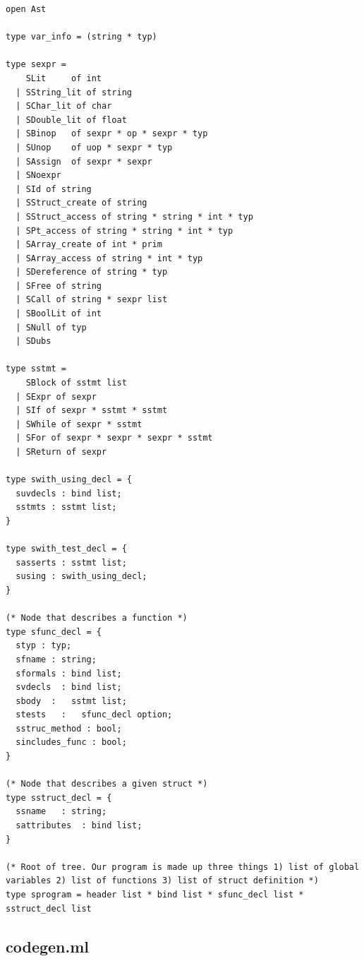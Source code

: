 \documentclass{article}
\begin{document}
\begin{lstlisting}
open Ast

type var_info = (string * typ)

type sexpr =
    SLit     of int
  | SString_lit of string
  | SChar_lit of char
  | SDouble_lit of float
  | SBinop   of sexpr * op * sexpr * typ
  | SUnop    of uop * sexpr * typ
  | SAssign  of sexpr * sexpr
  | SNoexpr
  | SId of string
  | SStruct_create of string
  | SStruct_access of string * string * int * typ
  | SPt_access of string * string * int * typ
  | SArray_create of int * prim
  | SArray_access of string * int * typ
  | SDereference of string * typ
  | SFree of string
  | SCall of string * sexpr list
  | SBoolLit of int
  | SNull of typ
  | SDubs

type sstmt =
    SBlock of sstmt list   
  | SExpr of sexpr
  | SIf of sexpr * sstmt * sstmt
  | SWhile of sexpr * sstmt
  | SFor of sexpr * sexpr * sexpr * sstmt
  | SReturn of sexpr

type swith_using_decl = {
  suvdecls : bind list;
  sstmts : sstmt list;
}

type swith_test_decl = {
  sasserts : sstmt list;
  susing : swith_using_decl;
}

(* Node that describes a function *)
type sfunc_decl = {
  styp : typ;
  sfname : string;
  sformals : bind list;
  svdecls  : bind list;
  sbody  :   sstmt list;
  stests   :   sfunc_decl option;
  sstruc_method : bool;
  sincludes_func : bool;
}

(* Node that describes a given struct *)
type sstruct_decl = {
  ssname   : string;
  sattributes  : bind list;
}

(* Root of tree. Our program is made up three things 1) list of global variables 2) list of functions 3) list of struct definition *)
type sprogram = header list * bind list * sfunc_decl list * sstruct_decl list

\end{lstlisting}

\newpage
\subsection{codegen.ml}
\end{document}

